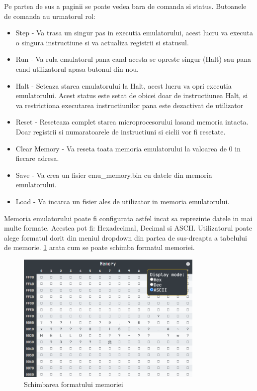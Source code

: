 \documentclass[titlepage,12pt]{article}
\DeclareRobustCommand{\code}[1]{{\ttfamily\small #1}}
\begin{document}
Pe partea de sus a paginii se poate vedea bara de comanda si status. Butoanele de comanda au urmatorul rol:
\begin{itemize}
    \item {\code{Step}} - Va trasa un singur pas in executia emulatorului, acest lucru va executa o singura instructiune si va actualiza registrii si statusul.
    \item {\code{Run}} - Va rula emulatorul pana cand acesta se opreste singur (Halt) sau pana cand utilizatorul apasa butonul din nou.
    \item {\code{Halt}} - Seteaza starea emulatorului la Halt, acest lucru va opri executia emulatorului. Acest status este setat de obicei doar de instructiunea Halt, si va restrictiona executarea instructiunilor pana este dezactivat de utilizator
    \item {\code{Reset}} - Reseteaza complet starea microprocesorului lasand memoria intacta. Doar registrii si numaratoarele de instructiuni si ciclii vor fi resetate.
    \item {\code{Clear Memory}} - Va reseta toata memoria emulatorului la valoarea de 0 in fiecare adresa. 
    \item {\code{Save}} - Va crea un fisier \code{emu\_memory.bin} cu datele din memoria emulatorului.
    \item {\code{Load}} - Va incarca un fisier ales de utilizator in memoria emulatorului.
\end{itemize}

Memoria emulatorului poate fi configurata astfel incat sa reprezinte datele in mai multe formate. Acestea pot fi: Hexadecimal, Decimal si ASCII. Utilizatorul poate alege formatul dorit din meniul dropdown din partea de sus-dreapta a tabelului de memorie. \cref{fig:memoryformat} arata cum se poate schimba formatul memoriei.


\begin{figure}[h!]
    \centering
    \includegraphics[width=0.8\textwidth]{images/memoryformat.png}
    \caption{Schimbarea formatului memoriei}
    \label{fig:memoryformat}
\end{figure}
\end{document}
